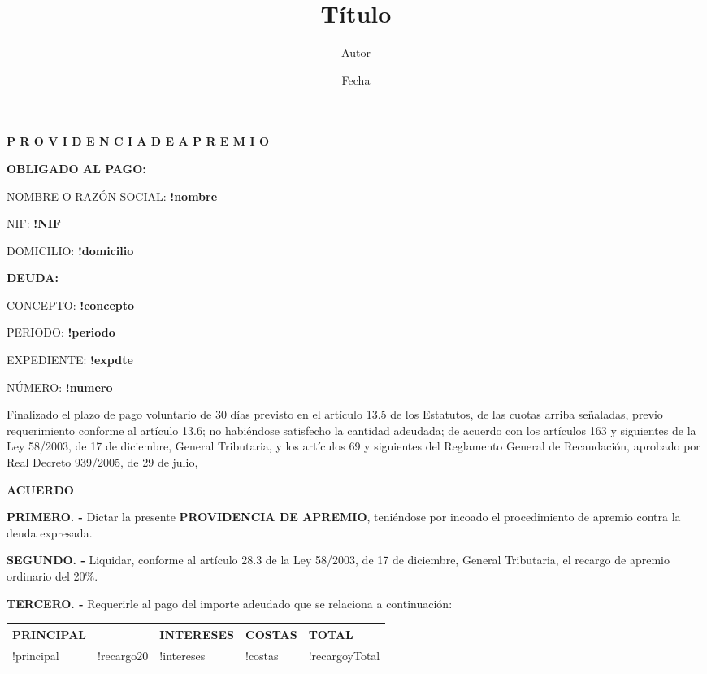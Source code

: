 \documentclass[12pt, a4paper, twoside]{article}
\title{Título}
\author{Autor}
\date{Fecha}
\begin{document}
\begin{center}
    \textbf{P R O V I D E N C I A\hspace{10pt}   D E\hspace{10pt}   A P R E M I O}
\end{center}
\begin{multicols}{2}
    \textbf{OBLIGADO AL PAGO:}

    NOMBRE O RAZÓN SOCIAL: \textbf{!nombre}

    NIF: \textbf{!NIF}

    DOMICILIO: \textbf{!domicilio}

    \columnbreak

    \textbf{DEUDA:}

    CONCEPTO: \textbf{!concepto}

    PERIODO: \textbf{!periodo}

    EXPEDIENTE: \textbf{!expdte}

    NÚMERO: \textbf{!numero}
\end{multicols}

Finalizado el plazo de pago voluntario de 30 días previsto en el artículo 13.5 de los Estatutos, de las cuotas arriba señaladas, previo requerimiento conforme al artículo 13.6; no habiéndose satisfecho la cantidad adeudada; de acuerdo con los artículos 163 y siguientes de la Ley 58/2003, de 17 de diciembre, General Tributaria, y los artículos 69 y siguientes del Reglamento General de Recaudación, aprobado por Real Decreto 939/2005, de 29 de julio,
\begin{center}
    \textbf{ACUERDO}
\end{center}
\textbf{PRIMERO. - } Dictar la presente \textbf{PROVIDENCIA DE APREMIO}, teniéndose por incoado el procedimiento de apremio contra la deuda expresada.

\textbf{SEGUNDO. - }  Liquidar, conforme al artículo 28.3 de la Ley 58/2003, de 17 de diciembre, General Tributaria, el recargo de apremio ordinario del 20\%.

\textbf{TERCERO. -} Requerirle al pago del importe adeudado que se relaciona a continuación:

\begin{center}
    \begin{tabularx}{\linewidth}{|Y|Y|Y|Y|Y|}
        \hline
        \textbf{PRINCIPAL} &  & \textbf{INTERESES} & \textbf{COSTAS} & \textbf{TOTAL}\\
        \hline
        !principal & !recargo20 & !intereses & !costas & !recargoyTotal \\
        \hline
    \end{tabularx}
\end{center}
\end{document}
